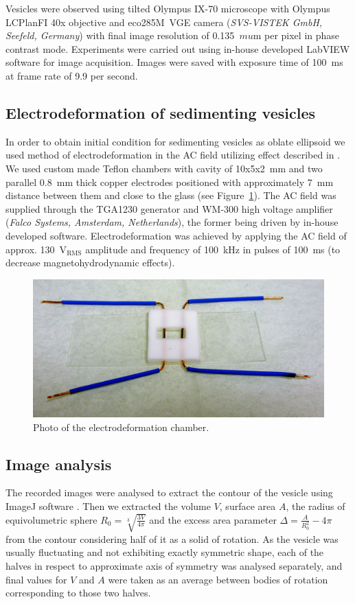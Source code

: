 \documentclass[10pt,a4paper]{article}
\begin{document}
Vesicles were observed using tilted Olympus IX-70 microscope with Olympus LCPlanFI 40x objective and eco285M~VGE camera \newline (\emph{SVS-VISTEK GmbH, Seefeld, Germany}) with final image resolution of 0.135~$mu$m per pixel in phase contrast mode.
Experiments were carried out using in-house developed LabVIEW software for image acquisition. Images were saved with exposure time of 100~ms at frame rate of 9.9 per second.

\subsection{Electrodeformation of sedimenting vesicles}

In order to obtain initial condition for sedimenting vesicles as oblate ellipsoid we used method of electrodeformation in the AC field utilizing effect described in \cite{Aranda2008}.
We used custom made Teflon chambers with cavity of 10x5x2~mm and two parallel 0.8~mm thick copper electrodes positioned with approximately 7~mm distance between them and close to the glass (see Figure~\ref{fig:chamber}).
The AC field was supplied through the TGA1230 generator and WM-300 high voltage amplifier (\emph{Falco Systems, Amsterdam, Netherlands}), the former being driven by in-house developed software.
Electrodeformation was achieved by applying the AC field of approx. 130~V$_\mathrm{RMS}$ amplitude and frequency of 100~kHz in pulses of 100~ms (to decrease magnetohydrodynamic effects).

\begin{figure}
 \centering
 \includegraphics[width=0.7\linewidth]{figs/electro-chamber}
 \caption{Photo of the electrodeformation chamber.}\label{fig:chamber}
\end{figure}

\subsection{Image analysis}
The recorded images were analysed to extract the contour of the vesicle using ImageJ software \cite{ImageJ}.
Then we extracted the volume $V$, surface area $A$, the radius of equivolumetric sphere $R_0 = \sqrt[3]{\frac{3V}{4\pi}}$ and the excess area parameter $\Delta = \frac{A}{R_0^2} - 4\pi$ from the contour considering half of it as a solid of rotation.
As the vesicle was usually fluctuating and not exhibiting exactly symmetric shape, each of the halves in respect to approximate axis of symmetry was analysed separately, and final values for $V$ and $A$ were taken as an average between bodies of rotation corresponding to those two halves.
\end{document}
